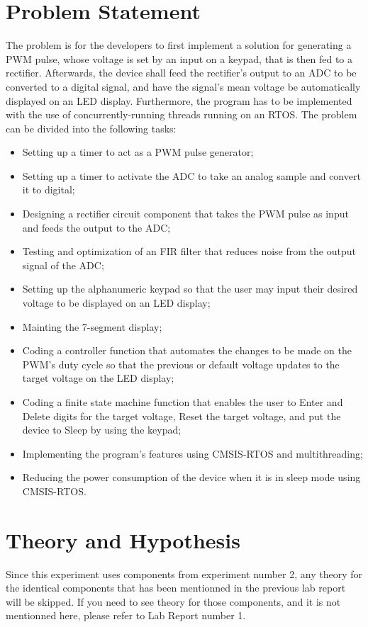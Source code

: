 \documentclass[12pt]{report}
\begin{document}
\section{Problem Statement}
The problem is for the developers to first implement a solution for generating a PWM pulse, whose voltage is set by an input on a keypad, that is then fed to a rectifier. Afterwards, the device shall feed the rectifier's output to an ADC to be converted to a digital signal, and have the signal's mean voltage be automatically displayed on an LED display. Furthermore, the program has to be implemented with the use of concurrently-running threads running on an RTOS. The problem can be divided into the following tasks:
\begin{itemize}
	\item Setting up a timer to act as a PWM pulse generator;
	\item Setting up a timer to activate the ADC to take an analog sample and convert it to digital;
	\item Designing a rectifier circuit component that takes the PWM pulse as input and feeds the output to the ADC;
	\item Testing and optimization of an FIR filter that reduces noise from the output signal of the ADC;
	\item Setting up the alphanumeric keypad so that the user may input their desired voltage to be displayed on an LED display;
	\item Mainting the 7-segment display;
	\item Coding a controller function that automates the changes to be made on the PWM's duty cycle so that the previous or default voltage updates to the target voltage on the LED display;
	\item Coding a finite state machine function that enables the user to Enter and Delete digits for the target voltage, Reset the target voltage, and put the device to Sleep by using the keypad;
	\item Implementing the program's features using CMSIS-RTOS and multithreading;
	\item Reducing the power consumption of the device when it is in sleep mode using CMSIS-RTOS.
\end{itemize}
\section{Theory and Hypothesis}
Since this experiment uses components from experiment number 2, any theory for the identical components that has been mentionned in the previous lab report will be skipped. If you need to see theory for those components, and it is not mentionned here, please refer to Lab Report number 1.
\end{document}
